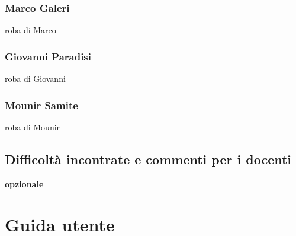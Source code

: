 \documentclass[a4paper,12pt]{report}
\begin{document}
\subsection*{Marco Galeri}
roba di Marco
\subsection*{Giovanni Paradisi}
roba di Giovanni
\subsection*{Mounir Samite}
roba di Mounir

\section{Difficoltà incontrate e commenti per i docenti}

\textbf{opzionale}



\appendix


\chapter{Guida utente}





\end{document}
